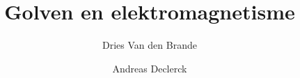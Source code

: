\usepackage[dutch]{babel}
\usepackage{amsmath}

\title{Golven en elektromagnetisme}
\author{Dries Van den Brande \and Andreas Declerck}